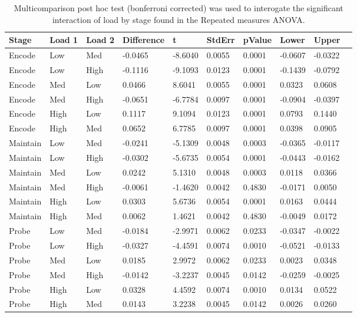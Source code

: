 \begin{table}
\centering
\begin{tabular}[0.2em]{@{}llllllllll@{}}\toprule
Stage & Load 1 & Load 2 & Difference & t & StdErr & pValue & Lower & Upper\\\toprule[0.2em]
Encode & Low & Med & -0.0465 & -8.6040 & 0.0055 & 0.0001 & -0.0607 & -0.0322 \\\midrule
Encode & Low & High & -0.1116 & -9.1093 & 0.0123 & 0.0001 & -0.1439 & -0.0792 \\\midrule
Encode & Med & Low & 0.0466 & 8.6041 & 0.0055 & 0.0001 & 0.0323 & 0.0608 \\\midrule
Encode & Med & High & -0.0651 & -6.7784 & 0.0097 & 0.0001 & -0.0904 & -0.0397 \\\midrule
Encode & High & Low & 0.1117 & 9.1094 & 0.0123 & 0.0001 & 0.0793 & 0.1440 \\\midrule
Encode & High & Med & 0.0652 & 6.7785 & 0.0097 & 0.0001 & 0.0398 & 0.0905 \\\midrule
Maintain & Low & Med & -0.0241 & -5.1309 & 0.0048 & 0.0003 & -0.0365 & -0.0117 \\\midrule
Maintain & Low & High & -0.0302 & -5.6735 & 0.0054 & 0.0001 & -0.0443 & -0.0162 \\\midrule
Maintain & Med & Low & 0.0242 & 5.1310 & 0.0048 & 0.0003 & 0.0118 & 0.0366 \\\midrule
Maintain & Med & High & -0.0061 & -1.4620 & 0.0042 & 0.4830 & -0.0171 & 0.0050 \\\midrule
Maintain & High & Low & 0.0303 & 5.6736 & 0.0054 & 0.0001 & 0.0163 & 0.0444 \\\midrule
Maintain & High & Med & 0.0062 & 1.4621 & 0.0042 & 0.4830 & -0.0049 & 0.0172 \\\midrule
Probe & Low & Med & -0.0184 & -2.9971 & 0.0062 & 0.0233 & -0.0347 & -0.0022 \\\midrule
Probe & Low & High & -0.0327 & -4.4591 & 0.0074 & 0.0010 & -0.0521 & -0.0133 \\\midrule
Probe & Med & Low & 0.0185 & 2.9972 & 0.0062 & 0.0233 & 0.0023 & 0.0348 \\\midrule
Probe & Med & High & -0.0142 & -3.2237 & 0.0045 & 0.0142 & -0.0259 & -0.0025 \\\midrule
Probe & High & Low & 0.0328 & 4.4592 & 0.0074 & 0.0010 & 0.0134 & 0.0522 \\\midrule
Probe & High & Med & 0.0143 & 3.2238 & 0.0045 & 0.0142 & 0.0026 & 0.0260 \\\bottomrule[0.2em]
\end{tabular}
\caption{Multicomparison post hoc test (bonferroni corrected) was used to interogate the significant interaction of load by stage found in the Repeated measures ANOVA.\label{tabel:tbl_RMAAFC1_PH_inter}}
\end{table}
